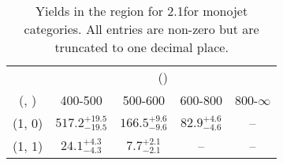 \begin{table}[h!]
\tiny
\centering
\caption{Yields in the \gj region for 2.1\ifb for monojet categories. All entries are non-zero but are truncated to one decimal place.\label{tab:yieldsnodata_gj_comb_mono}}
\begin{tabular}
{ccccc}
	\hline\hline
	& \multicolumn{4}{c}{\scalht (\gev)} \\ 
	 (\njet,  \nb) & 400-500 & 500-600 & 600-800 & 800-$\infty$ \\ [0.8ex] 
\hline
	(1, 0) & $517.2^{+ 19.5 }_{- 19.5 }$ & $166.5^{+ 9.6 }_{- 9.6 }$ & $82.9^{+ 4.6 }_{- 4.6 }$ & -- \\[0.5ex] 
	(1, 1) & $24.1^{+ 4.3 }_{- 4.3 }$ & $7.7^{+ 2.1 }_{- 2.1 }$ & -- & -- \\[0.5ex] 
	\hline
	\hline
\end{tabular}
\end{table}
